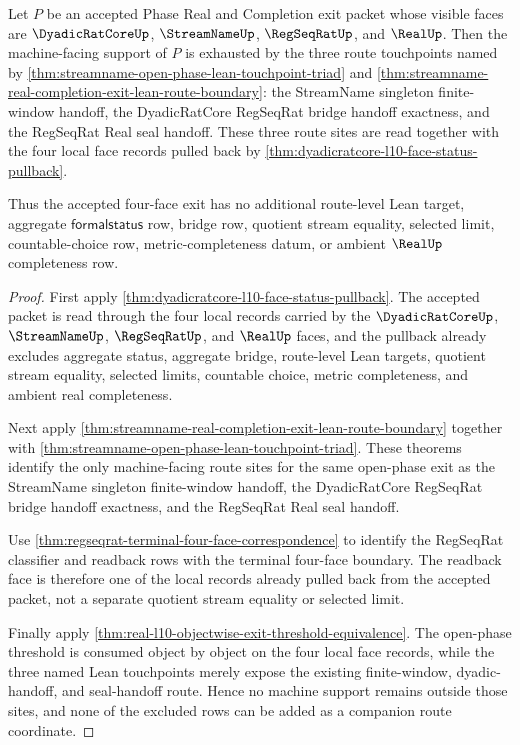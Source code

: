 \begin{theorem}
\label{thm:dyadicratcore-l10-exit-lean-touchpoint-completeness}
Let $P$ be an accepted Phase Real and Completion exit packet whose visible faces are $\DyadicRatCoreUp$, $\StreamNameUp$, $\RegSeqRatUp$, and $\RealUp$. Then the machine-facing support of $P$ is exhausted by the three route touchpoints named by \autoref{thm:streamname-open-phase-lean-touchpoint-triad} and \autoref{thm:streamname-real-completion-exit-lean-route-boundary}: the StreamName singleton finite-window handoff, the DyadicRatCore RegSeqRat bridge handoff exactness, and the RegSeqRat Real seal handoff. These three route sites are read together with the four local face records pulled back by \autoref{thm:dyadicratcore-l10-face-status-pullback}.

Thus the accepted four-face exit has no additional route-level Lean target, aggregate $\mathsf{formalstatus}$ row, bridge row, quotient stream equality, selected limit, countable-choice row, metric-completeness datum, or ambient $\RealUp$ completeness row.
\end{theorem}
\begin{proof}
First apply \autoref{thm:dyadicratcore-l10-face-status-pullback}. The accepted packet is read through the four local records carried by the $\DyadicRatCoreUp$, $\StreamNameUp$, $\RegSeqRatUp$, and $\RealUp$ faces, and the pullback already excludes aggregate status, aggregate bridge, route-level Lean targets, quotient stream equality, selected limits, countable choice, metric completeness, and ambient real completeness.

Next apply \autoref{thm:streamname-real-completion-exit-lean-route-boundary} together with \autoref{thm:streamname-open-phase-lean-touchpoint-triad}. These theorems identify the only machine-facing route sites for the same open-phase exit as the StreamName singleton finite-window handoff, the DyadicRatCore RegSeqRat bridge handoff exactness, and the RegSeqRat Real seal handoff.

Use \autoref{thm:regseqrat-terminal-four-face-correspondence} to identify the RegSeqRat classifier and readback rows with the terminal four-face boundary. The readback face is therefore one of the local records already pulled back from the accepted packet, not a separate quotient stream equality or selected limit.

Finally apply \autoref{thm:real-l10-objectwise-exit-threshold-equivalence}. The open-phase threshold is consumed object by object on the four local face records, while the three named Lean touchpoints merely expose the existing finite-window, dyadic-handoff, and seal-handoff route. Hence no machine support remains outside those sites, and none of the excluded rows can be added as a companion route coordinate.
\end{proof}

